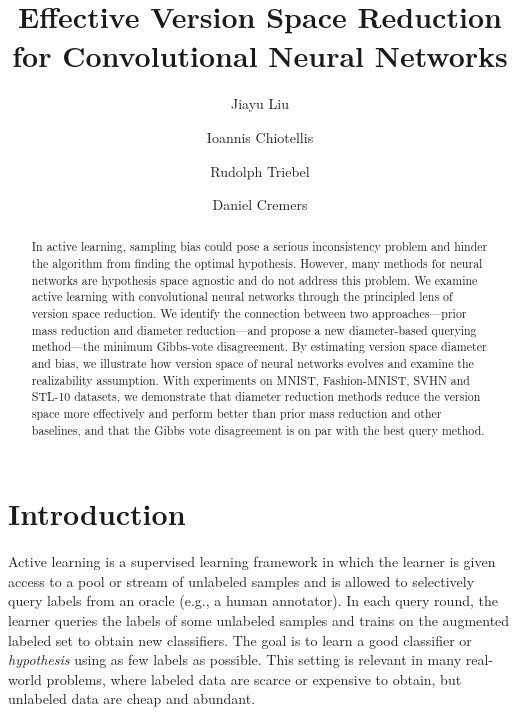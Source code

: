 \documentclass[runningheads, envcountsame, a4paper]{llncs}
\newcommand{\eg}{e.g.}
\begin{document}
\title{Effective Version Space Reduction for Convolutional Neural Networks}
\author{Jiayu Liu \Letter \and 
        Ioannis Chiotellis  \and
        Rudolph Triebel  \and
        Daniel Cremers }

\maketitle              \begin{abstract}
In active learning, sampling bias could pose a serious inconsistency problem and hinder the algorithm from finding the optimal hypothesis. However, many methods for neural networks are hypothesis space agnostic and do not address this problem. We examine active learning with convolutional neural networks through the principled lens of version space reduction. We identify the connection between two approaches---prior mass reduction and diameter reduction---and propose a new diameter-based querying method---the minimum Gibbs-vote disagreement. By estimating version space diameter and bias, we illustrate how version space of neural networks evolves and examine the realizability assumption. With experiments on MNIST, Fashion-MNIST, SVHN and STL-10 datasets, we demonstrate that diameter reduction methods reduce the version space more effectively and perform better than prior mass reduction and other baselines, and that the Gibbs vote disagreement is on par with the best query method.

\end{abstract}
\section{Introduction}
\label{sec:introduction}
Active learning is a supervised learning framework in which the learner is given access to a pool or stream of unlabeled samples and is allowed to selectively query labels from an oracle (\eg, a human annotator). In each query round, the learner queries the labels of some unlabeled samples and trains on the augmented labeled set to obtain new classifiers. The goal is to learn a good classifier or \textit{hypothesis} using as few labels as possible. This setting is relevant in many real-world problems, where labeled data are scarce or expensive to obtain, but unlabeled data are cheap and abundant. 
\end{document}
